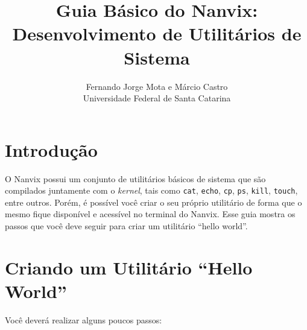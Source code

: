 \documentclass[11pt]{article}
\title{Guia Básico do Nanvix: Desenvolvimento de Utilitários de Sistema}
\author{Fernando Jorge Mota e Márcio Castro\\[0.3em]
\small Universidade Federal de Santa Catarina}
\date{}
\begin{document}
\maketitle

\section{Introdução}

O Nanvix possui um conjunto de utilitários básicos de sistema que são compilados juntamente com o \textit{kernel}, tais como \texttt{cat}, \texttt{echo}, \texttt{cp}, \texttt{ps}, \texttt{kill}, \texttt{touch}, entre outros. Porém, é possível você criar o seu próprio utilitário de forma que o mesmo fique disponível e acessível no terminal do Nanvix. Esse guia mostra os passos que você deve seguir para criar um utilitário ``hello world''.

\section{Criando um Utilitário ``Hello World''}

Você deverá realizar alguns poucos passos:
\end{document}
